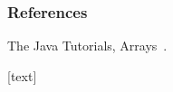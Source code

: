 \documentclass[aspectratio=169,10pt,compress]{beamer}
\begin{document}
\begin{frame}[t,fragile] \frametitle{References}
	\small The Java Tutorials, Arrays~\cite{TheJavaTutorialsArray}.

	\vspace{1em}
	[text]
	
	\tiny
\end{frame}




\begin{frame}[t,fragile]
	\begin{center}
		\vspace{4cm}
	\end{center}
\end{frame}
\end{document}
